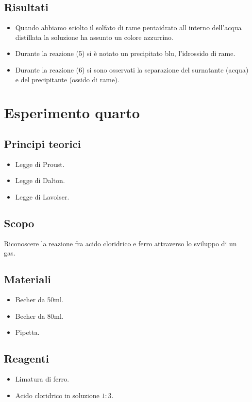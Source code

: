 \documentclass[a4paper,10pt]{article}
\begin{document}
	\subsection{Risultati}
	\begin{itemize}
		\item Quando abbiamo sciolto il solfato di rame pentaidrato all interno dell'acqua distillata la soluzione ha assunto un colore azzurrino.
		\item Durante la reazione (5) si è notato un precipitato blu, l'idrossido di rame.
		\item Durante la reazione (6) si sono osservati la separazione del surnatante (acqua) e del precipitante (ossido di rame).
	\end{itemize}
	\break
	
	
	
	
	
	\section{Esperimento quarto}
	\subsection{Principi teorici}
	\begin{itemize}
		\item Legge di Proust.
		\item Legge di Dalton.
		\item Legge di Lavoiser.
	\end{itemize}
	
	\subsection{Scopo}
	Riconoscere la reazione fra acido cloridrico e ferro attraverso lo sviluppo di un gas.
	\subsection{Materiali}
	\begin{itemize}
		\item Becher da 50ml.
		\item Becher da 80ml.
		\item Pipetta.
	\end{itemize}
	\subsection{Reagenti}
	\begin{itemize}
		\item Limatura di ferro.
		\item Acido cloridrico  in soluzione $1 : 3$.
	\end{itemize}
\end{document}
